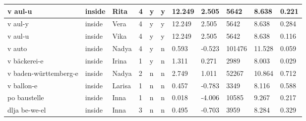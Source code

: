 \begin{longtable}{|p{4cm}|p{1cm}|p{1.2cm}|p{0.5cm}|p{0.5cm}|p{0.5cm}|R{1cm}|R{1cm}|R{1cm}|R{1cm}|R{1cm}|}
v aul-u                    & inside            & Rita          & 4                                   & y                          & y                          & 12.249     & 2.505         & 5642                    & 8.638                         & 0.221                   \\ \hline
v aul-y                    & inside            & Vera          & 4                                   & y                          & y                          & 12.249     & 2.505         & 5642                    & 8.638                         & 0.284                   \\ \hline
v aul-u                    & inside            & Vika          & 4                                   & y                          & y                          & 12.249     & 2.505         & 5642                    & 8.638                         & 0.116                   \\ \hline
v auto                     & inside            & Nadya         & 4                                   & y                          & n                          & 0.593      & -0.523        & 101476                  & 11.528                        & 0.059                   \\ \hline
v b\"{a}ckerei-e           & inside            & Irina         & 1                                   & y                          & n                          & 1.311      & 0.271         & 2989                    & 8.003                         & 0.029                   \\ \hline
v baden-w\"{u}rttemberg-e  & inside            & Nadya         & 2                                   & n                          & n                          & 2.749      & 1.011         & 52267                   & 10.864                        & 0.712                   \\ \hline
v ballon-e                 & inside            & Larisa        & 1                                   & n                          & n                          & 0.457      & -0.783        & 3349                    & 8.116                         & 0.588                   \\ \hline
po baustelle               & inside            & Inna          & 1                                   & n                          & n                          & 0.018      & -4.006        & 10585                   & 9.267                         & 0.217                   \\ \hline
dlja be-we-el              & inside            & Inna          & 3                                   & n                          & n                          & 0.495      & -0.703        & 3959                    & 8.284                         & 0.329                   \\ \hline

\end{longtable}
